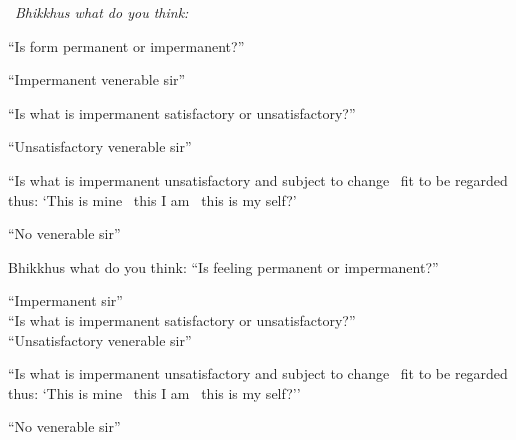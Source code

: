 \begin{english-only-leader}
  \anglebracketleft\ \hspace{-0.5mm}\textit{Bhikkhus what do you think:} \hspace{-0.5mm}\anglebracketright\
\end{english-only-leader}
  \begin{english-only-hangtogether}
    ``Is form permanent or impermanent?''
  \end{english-only-hangtogether}
  \begin{english-only-hangtogether}
  ``Impermanent venerable sir''
  \end{english-only-hangtogether}
  \begin{english-only-hangtogether}
  ``Is what is impermanent satisfactory or unsatisfactory?''
  \end{english-only-hangtogether}
  \begin{english-only-hangtogether}
  ``Unsatisfactory venerable sir''
  \end{english-only-hangtogether}
  \begin{english-only-hangtogether}
    ``Is what is impermanent unsatisfactory and subject to change \breathmark\ fit to be regarded thus: `This is mine \breathmark\ this I am \breathmark\ this is my self?'
  \end{english-only-hangtogether}
  \begin{english-only-hangtogether}
  ``No venerable sir''
  \end{english-only-hangtogether}

\begin{english-only-nohang}
  \begin{english-only-hang}
    Bhikkhus what do you think: ``Is feeling permanent or impermanent?''
  \end{english-only-hang}
  ``Impermanent sir''\\
  ``Is what is impermanent satisfactory or unsatisfactory?''\\
  ``Unsatisfactory venerable sir''\\
  \begin{english-hangtogether}
    ``Is what is impermanent unsatisfactory and subject to change \breathmark\ fit to be regarded thus: `This is mine \breathmark\ this I am \breathmark\ this is my self?''
  \end{english-hangtogether}
  ``No venerable sir''
\end{english-only-nohang}

